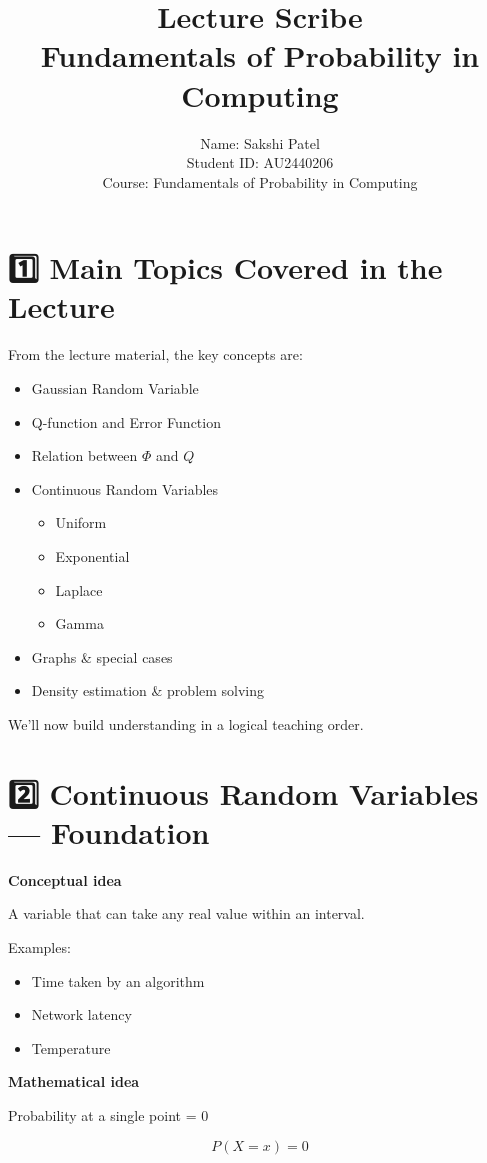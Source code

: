 \documentclass[12pt,a4paper]{article}
\title{\textbf{Lecture Scribe}\\Fundamentals of Probability in Computing}
\author{
Name: Sakshi Patel\\
Student ID: AU2440206\\
Course: Fundamentals of Probability in Computing\\
}
\date{}
\begin{document}
\maketitle
\newpage

\section*{1️⃣ Main Topics Covered in the Lecture}

From the lecture material, the key concepts are:

\begin{itemize}
\item Gaussian Random Variable
\item Q-function and Error Function
\item Relation between $\Phi$ and $Q$
\item Continuous Random Variables
\begin{itemize}
\item Uniform
\item Exponential
\item Laplace
\item Gamma
\end{itemize}
\item Graphs \& special cases
\item Density estimation \& problem solving
\end{itemize}

We’ll now build understanding in a logical teaching order.

\section*{2️⃣ Continuous Random Variables — Foundation}

\textbf{Conceptual idea}

A variable that can take any real value within an interval.

Examples:

\begin{itemize}
\item Time taken by an algorithm
\item Network latency
\item Temperature
\end{itemize}

\textbf{Mathematical idea}

Probability at a single point = 0

\[
P(X = x) = 0
\]
\end{document}
